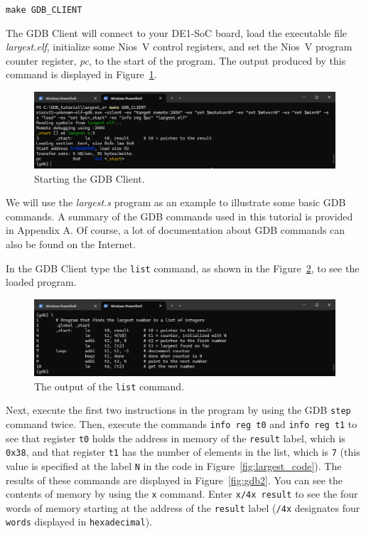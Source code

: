 \documentclass[11pt, twoside, pdftex]{article}
\begin{document}
{\texttt{make GDB\_CLIENT}

The GDB Client will connect to your DE1-SoC board, load the executable file {\it largest.elf},
initialize some Nios~V control registers, and set the Nios~V program counter register, {\it pc},
to the start of the program. The output produced by this command is displayed in 
Figure~\ref{fig:gdb_client}.

\begin{figure}[h]
    \begin{center}
        \includegraphics[scale=.6]{figures/gdb_client.png}
        \caption{Starting the GDB Client.}
        \label{fig:gdb_client}
    \end{center}
\end{figure}

We will use the {\it largest.s} program as an example to illustrate some basic GDB commands. 
A summary of the GDB commands used in this tutorial is provided in Appendix A. Of course, a 
lot of documentation about GDB commands can also be found on the Internet. 

In the GDB Client type the \texttt{list} command, as shown in the 
Figure~\ref{fig:gdb1}, to see the loaded program.

\begin{figure}[h]
    \begin{center}
        \includegraphics[scale=.6]{figures/gdb1.png}
        \caption{The output of the \texttt{list} command.}
        \label{fig:gdb1}
    \end{center}
\end{figure}

Next, execute the first two instructions in the program by using the 
GDB \texttt{step} command twice. Then, execute the commands 
\texttt{info reg t0} and \texttt{info reg t1} to see that register \texttt{t0} 
holds the address in memory of the \texttt{result} label, which is \texttt{0x38}, and that
register \texttt{t1} has the number of elements in the list, which is \texttt{7} (this value is
specified at the label \texttt{N} in the code in Figure~\ref{fig:largest_code}).
The results of these commands are displayed in Figure~\ref{fig:gdb2}. You can see the
contents of memory by using the \texttt{x} command. Enter \texttt{x/4x result} to see the
four words of memory starting at the address of the \texttt{result} label (\texttt{/4x}
designates four \texttt{words} displayed in \texttt{hexadecimal}).

}
\end{document}
